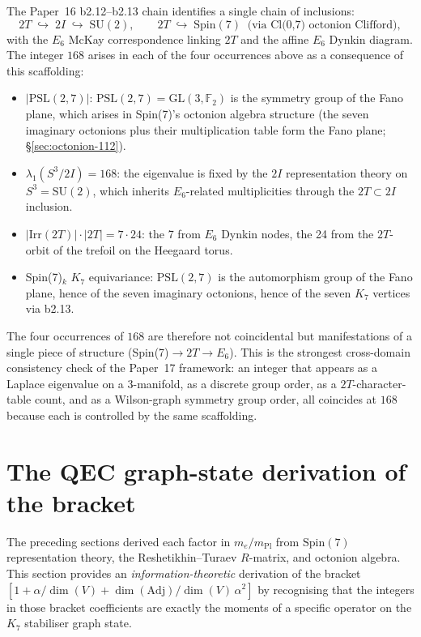\documentclass[11pt]{article}
\newcommand{\Spin}{\mathrm{Spin}}
\newcommand{\Adj}{\mathrm{Adj}}
\newcommand{\mPl}{m_{\mathrm{Pl}}}
\newcommand{\F}{\mathbb{F}}
\newcommand{\PSL}{\mathrm{PSL}}
\newcommand{\GL}{\mathrm{GL}}
\newcommand{\SU}{\mathrm{SU}}
\begin{document}
The Paper~16 b2.12--b2.13 chain identifies a single chain of
inclusions:
\begin{equation}
  2T \;\hookrightarrow\; 2I \;\hookrightarrow\; \SU(2),
  \qquad
  2T \;\hookrightarrow\; \Spin(7)
  \;\;\text{(via Cl(0,7) octonion Clifford)},
\end{equation}
with the $E_6$ McKay correspondence linking $2T$ and the affine
$E_6$ Dynkin diagram.  The integer $168$ arises in each of the
four occurrences above as a consequence of this scaffolding:
\begin{itemize}
\item $|\PSL(2,7)|$:  $\PSL(2,7) = \GL(3, \F_2)$ is the symmetry
  group of the Fano plane, which arises in Spin(7)'s octonion
  algebra structure (the seven imaginary octonions plus their
  multiplication table form the Fano plane;
  \S\ref{sec:octonion-112}).
\item $\lambda_1(S^3/2I) = 168$:  the eigenvalue is fixed by the
  $2I$ representation theory on $S^3 = \SU(2)$, which inherits
  $E_6$-related multiplicities through the $2T \subset 2I$
  inclusion.
\item $|\mathrm{Irr}(2T)| \cdot |2T| = 7 \cdot 24$:  the 7 from
  $E_6$ Dynkin nodes, the 24 from the $2T$-orbit of the trefoil
  on the Heegaard torus.
\item Spin(7)$_k$ $K_7$ equivariance:  $\PSL(2,7)$ is the
  automorphism group of the Fano plane, hence of the seven
  imaginary octonions, hence of the seven $K_7$ vertices via
  b2.13.
\end{itemize}

The four occurrences of $168$ are therefore not coincidental but
manifestations of a single piece of structure
(Spin(7)$\to 2T \to E_6$).  This is the strongest cross-domain
consistency check of the Paper~17 framework: an integer that
appears as a Laplace eigenvalue on a 3-manifold, as a discrete
group order, as a $2T$-character-table count, and as a Wilson-graph
symmetry group order, all coincides at $168$ because each is
controlled by the same scaffolding.

\section{The QEC graph-state derivation of the bracket}
\label{sec:qec-derivation}

The preceding sections derived each factor in $m_e/\mPl$ from
$\Spin(7)$ representation theory, the Reshetikhin--Turaev $R$-matrix,
and octonion algebra.  This section provides an
\emph{information-theoretic} derivation of the bracket
$[1 + \alpha/\dim(V) + \dim(\Adj)/\dim(V)\,\alpha^2]$ by recognising
that the integers in those bracket coefficients are exactly the
moments of a specific operator on the $K_7$ stabiliser graph state.
\end{document}
